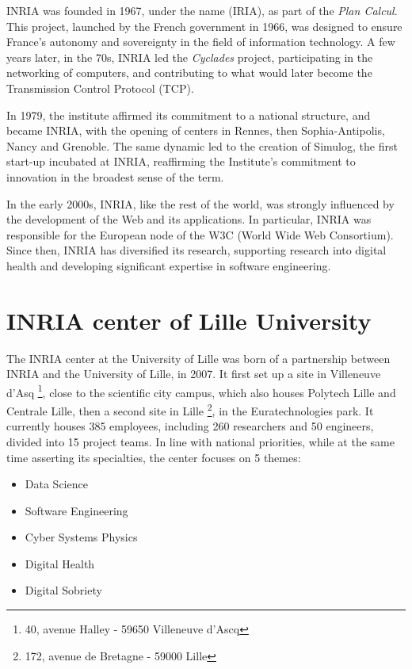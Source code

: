 INRIA was founded in 1967, under the name  (IRIA), as part of the \textit{Plan Calcul}\cite{PlanCalcul}. This project, launched by the French government in 1966, was designed to ensure France's autonomy and sovereignty in the field of information technology.
A few years later, in the 70s, INRIA led the \textit{Cyclades} project, participating in the networking of computers, and contributing to what would later become the Transmission Control Protocol (TCP).

In 1979, the institute affirmed its commitment to a national structure, and became INRIA, with the opening of centers in Rennes, then Sophia-Antipolis, Nancy and Grenoble. The same dynamic led to the creation of Simulog, the first start-up incubated at INRIA, reaffirming the Institute's commitment to innovation in the broadest sense of the term.

In the early 2000s, INRIA, like the rest of the world, was strongly influenced by the development of the Web and its applications. In particular, INRIA was responsible for the European node of the W3C (World Wide Web Consortium). Since then, INRIA has diversified its research, supporting research into digital health and developing significant expertise in software engineering. 

\section{INRIA center of Lille University}
The INRIA center at the University of Lille was born of a partnership between INRIA and the University of Lille, in 2007. It first set up a site in Villeneuve d'Asq \footnote{40, avenue Halley - 59650 Villeneuve d'Ascq}, close to the scientific city campus, which also houses Polytech Lille and Centrale Lille, then a second site in Lille \footnote{172, avenue de Bretagne - 59000 Lille}, in the Euratechnologies park. It currently houses 385 employees, including 260 researchers and 50 engineers, divided into 15 project teams.
In line with national priorities, while at the same time asserting its specialties, the center focuses on 5 themes: 
\begin{multicols}{2}
    
\begin{itemize}
    \item Data Science
    \item Software Engineering
    \item Cyber Systems Physics
    \item Digital Health
    \item Digital Sobriety
\end{itemize}
\end{multicols}

